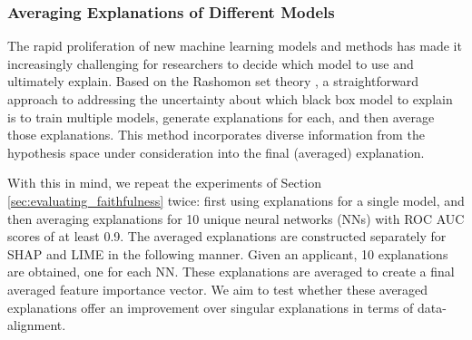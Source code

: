 \documentclass[mnsc,blindrev]{informs3}
\begin{document}
            
       

        \subsubsection{Averaging Explanations of Different Models}
           The rapid proliferation of new machine learning models and methods has made it increasingly challenging for researchers to decide which model to use and ultimately explain. Based on the Rashomon set theory \citep{semenova22rashomon,wang2022timbertrek,donnelly2023rashomon}, a straightforward approach to addressing the uncertainty about which black box model to explain is to train multiple models, generate explanations for each, and then average those explanations. This method incorporates diverse information from the hypothesis space under consideration into the final (averaged) explanation.


            With this in mind, we repeat the experiments of Section \ref{sec:evaluating_faithfulness} twice: first using explanations for a single model, and then averaging explanations for 10 unique neural networks (NNs) with ROC AUC scores of at least 0.9. The averaged explanations are constructed separately for SHAP and LIME in the following manner. Given an applicant, 10 explanations are obtained, one for each NN. These explanations are averaged to create a final averaged feature importance vector. We aim to test whether these averaged explanations offer an improvement over singular explanations in terms of data-alignment.
             
\end{document}
